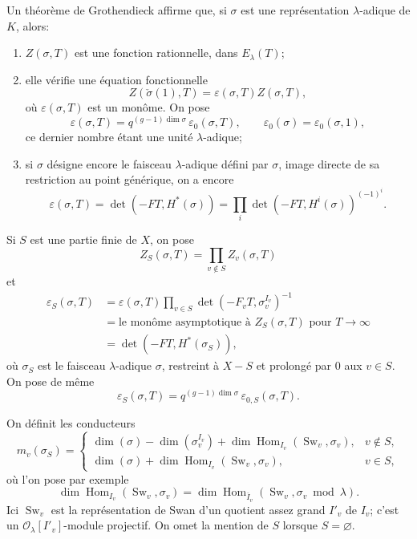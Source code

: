 \documentclass[11pt]{article}
\newcommand{\Hom}{\operatorname{Hom}}
\newcommand{\Sw}{\operatorname{Sw}}
\newcommand{\dimn}{\operatorname{dim}}
\newcommand{\eps}{\varepsilon}
\newcommand{\cO}{\mathcal O}
\newcommand{\dual}[1]{\check{#1}}
\begin{document}
Un théorème de Grothendieck affirme que, si $\sigma$ est une représentation $\lambda$-adique de $K$, alors:
\begin{enumerate}[label=\alph*)]
\item $Z(\sigma,T)$ est une fonction rationnelle, dans $E_\lambda(T)$;
\item elle vérifie une équation fonctionnelle
\[
 Z(\dual\sigma(1),T)=\eps(\sigma,T) Z(\sigma,T),
\]
où $\eps(\sigma,T)$ est un monôme. On pose
\[
 \eps(\sigma,T)=q^{(g-1)\dimn\sigma}\,\eps_0(\sigma,T),
 \qquad \eps_0(\sigma)=\eps_0(\sigma,1),
\]
ce dernier nombre étant une unité $\lambda$-adique;
\item si $\sigma$ désigne encore le faisceau $\lambda$-adique défini par $\sigma$, image directe de sa restriction au point générique, on a encore
\[
 \eps(\sigma,T)=\det(-FT,H^*(\sigma))
 =\prod_i \det(-FT,H^i(\sigma))^{(-1)^i}.
\]
\end{enumerate}

Si $S$ est une partie finie de $X$, on pose
\[
 Z_S(\sigma,T)=\prod_{v\notin S} Z_v(\sigma,T)
\]
et
\begin{align*}
 \eps_S(\sigma,T)
 &=\eps(\sigma,T)\prod_{v\in S}\det(-F_vT,\sigma_v^{I_v})^{-1} \\
 &=\text{le monôme asymptotique à }Z_S(\sigma,T)\text{ pour }T\to\infty \\
 &=\det(-FT,H^*(\sigma_S)),
\end{align*}
où $\sigma_S$ est le faisceau $\lambda$-adique $\sigma$, restreint à $X-S$ et prolongé par $0$ aux $v\in S$. On pose de même
\[
 \eps_S(\sigma,T)=q^{(g-1)\dimn\sigma}\,\eps_{0,S}(\sigma,T).
\]

On définit les conducteurs
\[
 m_v(\sigma_S)=
 \begin{cases}
 \dimn(\sigma)-\dimn(\sigma_v^{I_v})+
 \dimn \Hom_{I_v}(\Sw_v,\sigma_v),& v\notin S,\\[0.4em]
 \dimn(\sigma)+\dimn \Hom_{I_v}(\Sw_v,\sigma_v),& v\in S,
 \end{cases}
\]
où l'on pose par exemple
\[
 \dimn\Hom_{I_v}(\Sw_v,\sigma_v)=
 \dimn\Hom_{\overline I_v}(\Sw_v,\sigma_v\bmod \lambda).
\]
Ici $\Sw_v$ est la représentation de Swan d'un quotient assez grand $I'_v$ de $I_v$; c'est un $\cO_\lambda[I'_v]$-module projectif. On omet la mention de $S$ lorsque $S=\varnothing$.
\end{document}
